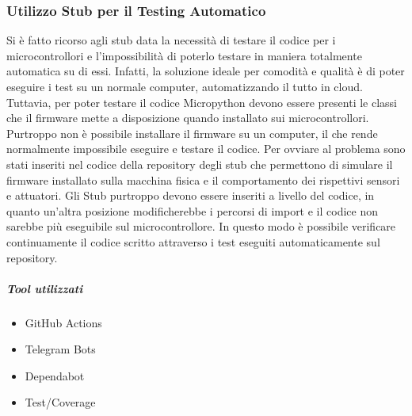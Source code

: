         \subsubsection{Utilizzo Stub per il Testing Automatico}
        Si è fatto ricorso agli stub data la necessità di testare il codice per i microcontrollori e l'impossibilità di poterlo testare in maniera totalmente automatica su di essi. Infatti, la soluzione ideale per comodità e qualità è di poter eseguire i test su un normale computer, automatizzando il tutto in cloud. Tuttavia, per poter testare il codice Micropython devono essere presenti le classi che il firmware mette a disposizione quando installato sui microcontrollori. Purtroppo non è possibile installare il firmware su un computer, il che rende normalmente impossibile eseguire e testare il codice. 
        Per ovviare al problema sono stati inseriti nel codice della repository degli stub che permettono di simulare il firmware installato sulla macchina fisica e il comportamento dei rispettivi sensori e attuatori. Gli Stub purtroppo devono essere inseriti a livello del codice, in quanto un'altra posizione modificherebbe i percorsi di import e il codice non sarebbe più eseguibile sul microcontrollore. In questo modo è possibile verificare continuamente il codice scritto attraverso i test eseguiti automaticamente sul repository.
        \subparagraph{Tool utilizzati}
        \begin{itemize}
            \item GitHub Actions
            \item Telegram Bots
            \item Dependabot
            \item Test/Coverage
        \end{itemize}








